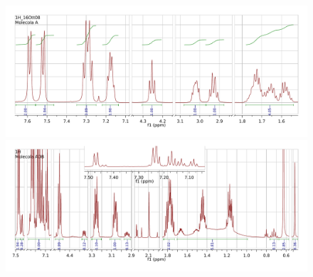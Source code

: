\documentclass[a4paper, italian, oneside, 12pt]{article}
\begin{document}
\clearpage
\renewcommand{\rightmark}{Spettri $^1$H NMR}

\addtolength{\hoffset}{-70pt}


\begin{landscape}
\begin{figure}[ht]
\includegraphics[height=0.7\textheight]{img/1hAc.pdf}\\\vspace{-20pt}
\includegraphics[height=0.7\textheight]{img/1hAOBb.pdf}
\end{figure}
\end{landscape}
\end{document}
